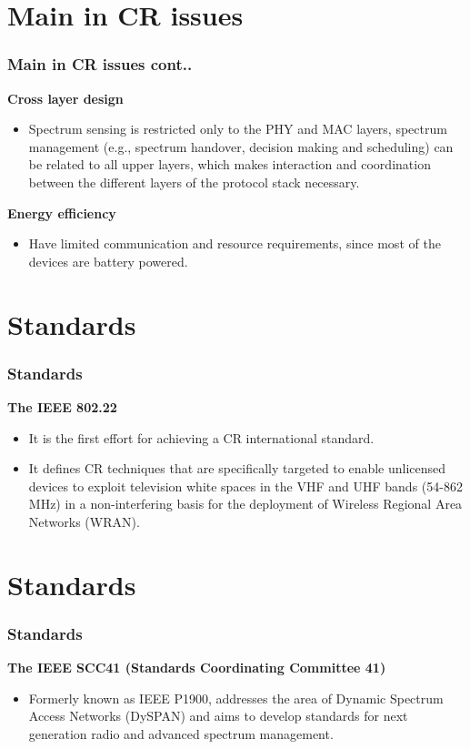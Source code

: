 \documentclass{beamer}
\begin{document}
\section{Main in CR issues}
\begin{frame}
\frametitle{Main in CR issues cont..}
\textbf{Cross layer design}\\
\begin{itemize}
\item Spectrum sensing is restricted only to the PHY and MAC layers, spectrum management (e.g., spectrum handover, decision making and scheduling) can be related to all upper layers, which makes interaction and coordination between the different layers of the protocol stack necessary.\\ 
\end{itemize}
\textbf{Energy efficiency}\\
\begin{itemize}
\item Have limited communication and resource requirements, since most of the devices are battery powered. 
\end{itemize}


\end{frame}

\section{Standards}
\begin{frame}
\frametitle{Standards}
\textbf{The IEEE 802.22 }
\begin{itemize}
\item It is the first effort for achieving a CR international standard.
\item It defines CR techniques that are specifically targeted to enable unlicensed devices to exploit television white spaces in the VHF and UHF bands (54-862 MHz) in a non-interfering basis for the deployment of Wireless Regional Area Networks (WRAN). 
\end{itemize}

\end{frame}

\section{Standards}
\begin{frame}
\frametitle{Standards}
\textbf{The IEEE SCC41 (Standards Coordinating Committee 41)}
\begin{itemize}
\item Formerly known as IEEE P1900, addresses the area of Dynamic Spectrum Access Networks (DySPAN) and aims to develop standards for next generation radio and advanced spectrum management. 
\end{itemize}
\end{frame}
\end{document}
